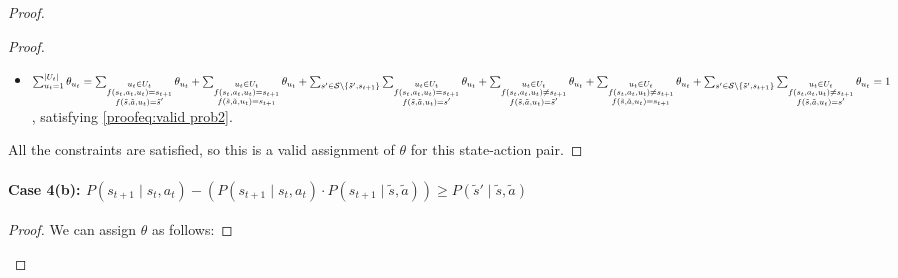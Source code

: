 \begin{proof}
\begin{proof}
\begin{itemize}
    \item $\sum_{u_t = 1}^{|U_t|} \theta_{u_t} = \sum_{\substack{u_t \in U_t \\f(s_t, a_t, u_t) = s_{t+1} \\ f(\tilde{s}, \tilde{a}, u_t) = \tilde{s}'}} \theta_{u_t} + \sum_{\substack{u_t \in U_t \\f(s_t, a_t, u_t) = s_{t+1} \\ f(\tilde{s}, \tilde{a}, u_t) = s_{t+1}}} \theta_{u_t} +  \sum_{s' \in \mathcal{S}\setminus\{\tilde{s}', s_{t+1}\}}\sum_{\substack{u_t \in U_t \\f(s_t, a_t, u_t) = s_{t+1} \\ f(\tilde{s}, \tilde{a}, u_t) = s'}}{\theta_{u_t}} \\+ \sum_{\substack{u_t \in U_t \\f(s_t, a_t, u_t) \neq s_{t+1} \\ f(\tilde{s}, \tilde{a}, u_t) = \tilde{s}'}} \theta_{u_t} + 
    \sum_{\substack{u_t \in U_t \\f(s_t, a_t, u_t) \neq s_{t+1} \\ f(\tilde{s}, \tilde{a}, u_t) = s_{t+1}}} \theta_{u_t} + \sum_{s' \in \mathcal{S}\setminus\{\tilde{s}', s_{t+1}\}}\sum_{\substack{u_t \in U_t \\f(s_t, a_t, u_t) \neq s_{t+1} \\ f(\tilde{s}, \tilde{a}, u_t) = s'}}{\theta_{u_t}} = 1$, satisfying \eqref{proofeq:valid prob2}.
\end{itemize}

All the constraints are satisfied, so this is a valid assignment of $\theta$ for this state-action pair.
\end{proof}

\paragraph{Case 4(b): $P(s_{t+1} \mid s_t, a_t) - (P(s_{t+1} \mid s_t, a_t) \cdot P(s_{t+1} \mid \tilde{s}, \tilde{a})) \geq P(\tilde{s}' \mid \tilde{s}, \tilde{a})$}
\noindent
\begin{proof}
We can assign $\theta$ as follows:


\end{proof}
\end{proof}
